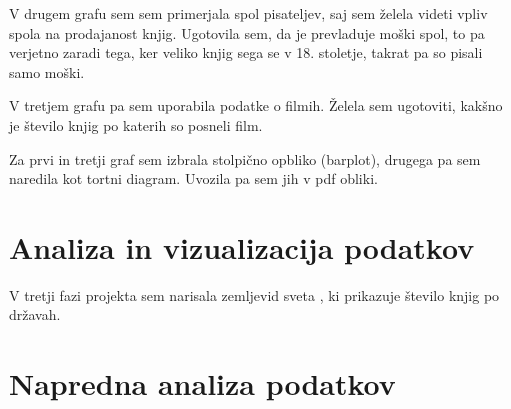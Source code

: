 \documentclass[11pt,a4paper]{article}
\begin{document}
V drugem grafu sem sem primerjala spol pisateljev, saj sem želela videti vpliv spola na prodajanost knjig. Ugotovila sem, da je prevladuje moški spol, to pa verjetno zaradi tega, ker veliko knjig sega se v 18. stoletje, takrat pa so pisali samo moški. 

V tretjem grafu pa sem uporabila podatke o filmih. Želela sem ugotoviti, kakšno je število knjig po katerih so posneli film. 

Za prvi in tretji graf sem izbrala stolpično opbliko (barplot), drugega pa sem naredila kot tortni diagram. Uvozila pa sem jih v pdf obliki. 





\section{Analiza in vizualizacija podatkov}


V tretji fazi projekta sem narisala zemljevid sveta , ki prikazuje število knjig po državah.
 





\section{Napredna analiza podatkov}
\end{document}
